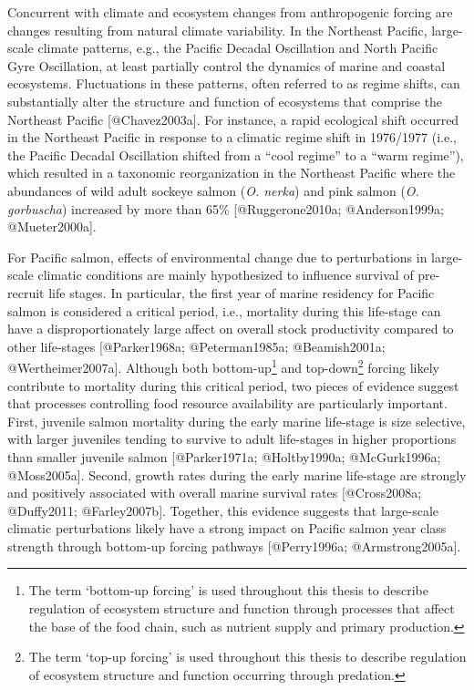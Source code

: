Concurrent with climate and ecosystem changes from anthropogenic forcing
are changes resulting from natural climate variability. In the Northeast
Pacific, large-scale climate patterns, e.g., the Pacific Decadal
Oscillation and North Pacific Gyre Oscillation, at least partially
control the dynamics of marine and coastal ecosystems. Fluctuations in
these patterns, often referred to as regime shifts, can substantially
alter the structure and function of ecosystems that comprise the
Northeast Pacific {[}@Chavez2003a{]}. For instance, a rapid ecological
shift occurred in the Northeast Pacific in response to a climatic regime
shift in 1976/1977 (i.e., the Pacific Decadal Oscillation shifted from a
``cool regime'' to a ``warm regime''), which resulted in a taxonomic
reorganization in the Northeast Pacific where the abundances of wild
adult sockeye salmon (\emph{O. nerka}) and pink salmon (\emph{O.
gorbuscha}) increased by more than 65\% {[}@Ruggerone2010a;
@Anderson1999a; @Mueter2000a{]}.

For Pacific salmon, effects of environmental change due to perturbations
in large-scale climatic conditions are mainly hypothesized to influence
survival of pre-recruit life stages. In particular, the first year of
marine residency for Pacific salmon is considered a critical period,
i.e., mortality during this life-stage can have a disproportionately
large affect on overall stock productivity compared to other life-stages
{[}@Parker1968a; @Peterman1985a; @Beamish2001a; @Wertheimer2007a{]}.
Although both bottom-up\footnote{The term `bottom-up forcing' is used
  throughout this thesis to describe regulation of ecosystem structure
  and function through processes that affect the base of the food chain,
  such as nutrient supply and primary production.} and
top-down\footnote{The term `top-up forcing' is used throughout this
  thesis to describe regulation of ecosystem structure and function
  occurring through predation.} forcing likely contribute to mortality
during this critical period, two pieces of evidence suggest that
processes controlling food resource availability are particularly
important. First, juvenile salmon mortality during the early marine
life-stage is size selective, with larger juveniles tending to survive
to adult life-stages in higher proportions than smaller juvenile salmon
{[}@Parker1971a; @Holtby1990a; @McGurk1996a; @Moss2005a{]}. Second,
growth rates during the early marine life-stage are strongly and
positively associated with overall marine survival rates {[}@Cross2008a;
@Duffy2011; @Farley2007b{]}. Together, this evidence suggests that
large-scale climatic perturbations likely have a strong impact on
Pacific salmon year class strength through bottom-up forcing pathways
{[}@Perry1996a; @Armstrong2005a{]}.

